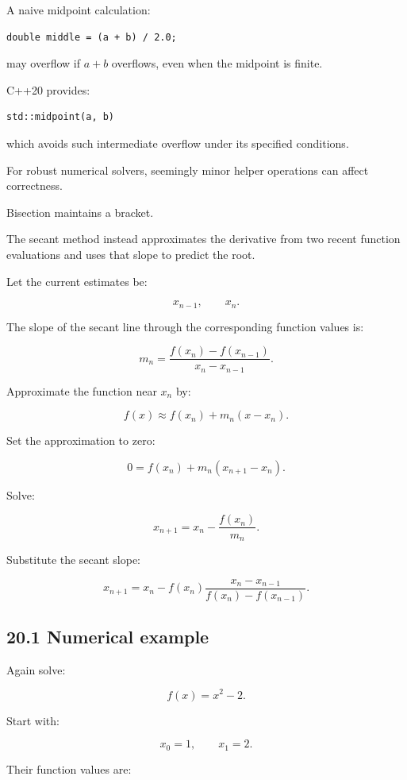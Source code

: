 A naive midpoint calculation:

\begin{verbatim}
double middle = (a + b) / 2.0;
\end{verbatim}

may overflow if \(a+b\) overflows, even when the midpoint is finite.

C++20 provides:

\begin{verbatim}
std::midpoint(a, b)
\end{verbatim}

which avoids such intermediate overflow under its specified conditions.

For robust numerical solvers, seemingly minor helper operations can affect correctness.

Bisection maintains a bracket.

The secant method instead approximates the derivative from two recent function evaluations and uses that slope to predict the root.

Let the current estimates be:

\[ x_{n-1},\qquad x_n. \]

The slope of the secant line through the corresponding function values is:

\[ \boxed{ m_n= \frac{ f(x_n)-f(x_{n-1}) }{ x_n-x_{n-1} } }. \]

Approximate the function near \(x_n\) by:

\[ f(x)\approx f(x_n)+m_n(x-x_n). \]

Set the approximation to zero:

\[ 0=f(x_n)+m_n(x_{n+1}-x_n). \]

Solve:

\[ x_{n+1}=x_n-\frac{f(x_n)}{m_n}. \]

Substitute the secant slope:

\[ \boxed{ x_{n+1} = x_n- f(x_n) \frac{x_n-x_{n-1}} {f(x_n)-f(x_{n-1})} }. \]

\subsection{20.1 Numerical example}\label{02-foundations-ii-ch028-numerical-example-2}

Again solve:

\[ f(x)=x^2-2. \]

Start with:

\[ x_0=1,\qquad x_1=2. \]

Their function values are:

